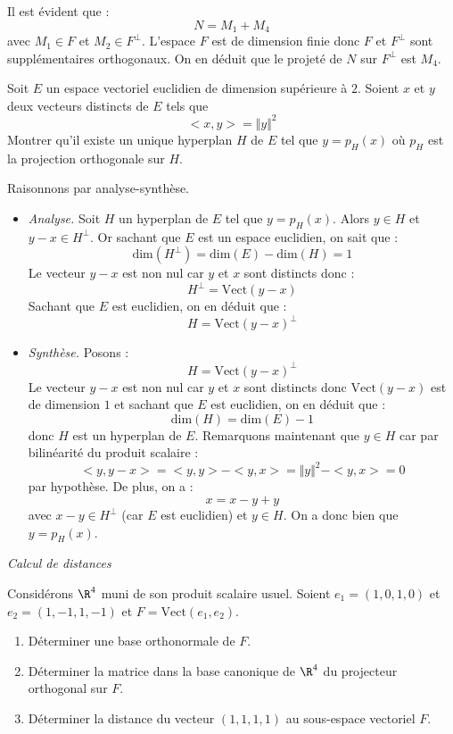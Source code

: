 \documentclass[a4paper,10pt]{report}
\begin{document}
\begin{enumerate}
\medskip

\noindent Il est évident que :
$$ N= M_1+M_4$$
avec $M_1 \in F$ et $M_2 \in F^{\perp}$. L'espace $F$ est de dimension finie donc $F$ et $F^{\perp}$ sont supplémentaires orthogonaux. On en déduit que le projeté de $N$ sur $F^{\perp}$ est $M_4$.
\end{enumerate}

\begin{Exercice}{} Soit $E$ un espace vectoriel euclidien de dimension supérieure à $2$.  Soient $x$ et $y$ deux vecteurs distincts de $E$ tels que $$< x, y> =\Vert y \Vert^{2}$$
 Montrer qu'il existe un unique hyperplan $H$ de $E$ tel que $y = p_{H}(x)$ où $p_H$ est la projection orthogonale sur $H$.
 \end{Exercice}
 
 \corr Raisonnons par analyse-synthèse.
 
 \begin{itemize}
 \item \textit{Analyse.} Soit $H$ un hyperplan de $E$ tel que $y = p_{H}(x)$. Alors $y \in H$ et $y-x \in H^{\perp}$. Or sachant que $E$ est un espace euclidien, on sait que :
 $$ \textrm{dim}(H^{\perp})= \textrm{dim}(E) - \textrm{dim}(H)=1$$
 Le vecteur $y-x$ est non nul car $y$ et $x$ sont distincts donc :
 $$ H^{\perp}= \textrm{Vect}(y-x)$$
 Sachant que $E$ est euclidien, on en déduit que :
 $$ H = \textrm{Vect}(y-x)^{\perp}$$
 \item \textit{Synthèse.} Posons :
 $$ H = \textrm{Vect}(y-x)^{\perp}$$
 Le vecteur $y-x$ est non nul car $y$ et $x$ sont distincts donc $ \textrm{Vect}(y-x)$ est de dimension $1$ et sachant que $E$ est euclidien, on en déduit que :
 $$ \textrm{dim}(H) = \textrm{dim}(E) - 1 $$
 donc $H$ est un hyperplan de $E$. Remarquons maintenant que $y \in H$ car par bilinéarité du produit scalaire :
 $$ <y,y-x> = <y,y>-<y,x>= \Vert y \Vert^2 - <y,x>= 0$$
 par hypothèse. De plus, on a :
 $$ x=x-y+y$$
 avec $x-y \in H^{\perp}$ (car $E$ est euclidien) et $y \in H$. On a donc bien que $y = p_H(x)$.
\end{itemize}



\medskip

\begin{center}
\textit{{ {\large Calcul de distances}}}
\end{center}

\medskip

\begin{Exercice}{} Considérons $\R^4$ muni de son produit scalaire usuel. Soient $e_1=(1,0,1,0)$ et $e_2=(1,-1,1,-1)$ et $F=\textrm{Vect}(e_1,e_2)$.
\begin{enumerate}
    \item  D\'eterminer une base orthonormale de $F.$
    \item  D\'eterminer la matrice dans la base canonique de $\R^4$ du projecteur orthogonal
sur $F.$
    \item  D\'eterminer la distance du vecteur $(1,1,1,1)$ au sous-espace vectoriel  $F.$
\end{enumerate}
\end{Exercice}
\end{document}
